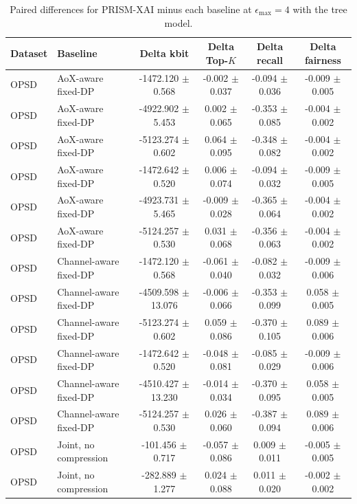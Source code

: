 \begin{table}[t]
\caption{Paired differences for PRISM-XAI minus each baseline at $\epsilon_{\max}=4$ with the tree model.}
\label{tab:paired-differences}
\centering
\scriptsize
\setlength{\tabcolsep}{3pt}
\begin{tabular}{llcccc}
\toprule
Dataset & Baseline & Delta kbit & Delta Top-$K$ & Delta recall & Delta fairness \\
\midrule
OPSD & AoX-aware fixed-DP & -1472.120 $\pm$ 0.568 & -0.002 $\pm$ 0.037 & -0.094 $\pm$ 0.036 & -0.009 $\pm$ 0.005 \\
OPSD & AoX-aware fixed-DP & -4922.902 $\pm$ 5.453 & 0.002 $\pm$ 0.065 & -0.353 $\pm$ 0.085 & -0.004 $\pm$ 0.002 \\
OPSD & AoX-aware fixed-DP & -5123.274 $\pm$ 0.602 & 0.064 $\pm$ 0.095 & -0.348 $\pm$ 0.082 & -0.004 $\pm$ 0.002 \\
OPSD & AoX-aware fixed-DP & -1472.642 $\pm$ 0.520 & 0.006 $\pm$ 0.074 & -0.094 $\pm$ 0.032 & -0.009 $\pm$ 0.005 \\
OPSD & AoX-aware fixed-DP & -4923.731 $\pm$ 5.465 & -0.009 $\pm$ 0.028 & -0.365 $\pm$ 0.064 & -0.004 $\pm$ 0.002 \\
OPSD & AoX-aware fixed-DP & -5124.257 $\pm$ 0.530 & 0.031 $\pm$ 0.068 & -0.356 $\pm$ 0.063 & -0.004 $\pm$ 0.002 \\
OPSD & Channel-aware fixed-DP & -1472.120 $\pm$ 0.568 & -0.061 $\pm$ 0.040 & -0.082 $\pm$ 0.032 & -0.009 $\pm$ 0.006 \\
OPSD & Channel-aware fixed-DP & -4509.598 $\pm$ 13.076 & -0.006 $\pm$ 0.066 & -0.353 $\pm$ 0.099 & 0.058 $\pm$ 0.005 \\
OPSD & Channel-aware fixed-DP & -5123.274 $\pm$ 0.602 & 0.059 $\pm$ 0.086 & -0.370 $\pm$ 0.105 & 0.089 $\pm$ 0.006 \\
OPSD & Channel-aware fixed-DP & -1472.642 $\pm$ 0.520 & -0.048 $\pm$ 0.081 & -0.085 $\pm$ 0.029 & -0.009 $\pm$ 0.006 \\
OPSD & Channel-aware fixed-DP & -4510.427 $\pm$ 13.230 & -0.014 $\pm$ 0.034 & -0.370 $\pm$ 0.095 & 0.058 $\pm$ 0.005 \\
OPSD & Channel-aware fixed-DP & -5124.257 $\pm$ 0.530 & 0.026 $\pm$ 0.060 & -0.387 $\pm$ 0.094 & 0.089 $\pm$ 0.006 \\
OPSD & Joint, no compression & -101.456 $\pm$ 0.717 & -0.057 $\pm$ 0.086 & 0.009 $\pm$ 0.011 & -0.005 $\pm$ 0.005 \\
OPSD & Joint, no compression & -282.889 $\pm$ 1.277 & 0.024 $\pm$ 0.088 & 0.011 $\pm$ 0.020 & -0.002 $\pm$ 0.002 \\

\end{tabular}
\end{table}
